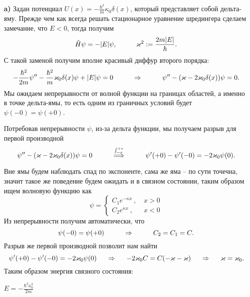 \textbf{a)}
Задан потенциал $U(x) = - \frac{\hbar^2}{m}\kappa_0 \delta(x)$, который представляет собой дельта-яму. Прежде чем как всегда решать стационарное уравнение шредингера сделаем замечание, что $E < 0$, тогда получим
\begin{equation*}
	\hat{H} \psi = - |E| \psi,
	\hspace{1 cm}
	\kappa^2 := \frac{2 m |E|}{\hbar}.
\end{equation*}
С такой заменой получим вполне красивый диффур второго порядка:
\begin{equation*}
	-\frac{\hbar^2}{2m} \psi'' - \frac{\hbar^2}{m}\kappa_0 \delta(x) \psi + |E|\psi = 0
	\hspace{1 cm}
	\Rightarrow
	\hspace{1 cm}
	\psi'' - (\kappa - 2 \kappa_0 \delta(x))\psi=0.
\end{equation*}
Мы ожидаем непрерывности от волной функции на границах областей, а именно в точке дельта-ямы, то есть одним из граничных условий будет $\psi(-0) = \psi(+0)$.

Потребовав непрерывности $\psi$, из-за дельта функции,  мы получаем разрыв для первой производной
\begin{equation*}
	\psi'' - (\kappa - 2 \kappa_0 \delta(x))\psi=0
	\hspace{1 cm}
	\overset{\int_{-\varepsilon}^{+\varepsilon} }{\Longrightarrow}
	\hspace{1 cm}
	\psi'(+0) - \psi'(-0) = - 2 \kappa_0 \psi(0).
\end{equation*}

Вне ямы будем наблюдать спад по экспоненте, сама же яма -- по сути точечна, значит такое же поведение будем ожидать и в связном состоянии, таким образом ищем волновую функцию как
\begin{equation*}
	\psi = \left\{\begin{aligned}
		C_1 e^{-\kappa x} \ , \ & x>0\\
		C_2 e^{\kappa x} \ , \ & x<0
	\end{aligned}\right.
\end{equation*}
Из непрерывности получим автоматически, что
\begin{equation*}
	\psi(-0) = \psi(+0)
	\hspace{1 cm}
	\Rightarrow
	\hspace{1 cm}
	C_2 = C_1 = C.
\end{equation*}
Разрыв же первой производной позволит нам найти
\begin{equation*}
	\psi'(+0) - \psi'(-0) = - 2 \kappa_0 \psi(0)
	\hspace{0.5 cm}
	\Rightarrow
	\hspace{0.5 cm}
	- 2 \kappa_0 C = C (-\kappa - \kappa)
	\hspace{0.5 cm}
	\Rightarrow
	\hspace{0.5 cm}
	\kappa = \kappa_0.
\end{equation*}
Таким образом  энергия связного состояния:
\begin{flushright}
	$\boxed{E = - \frac{\hbar^2 \kappa_0^2}{2 m}}$
\end{flushright}

